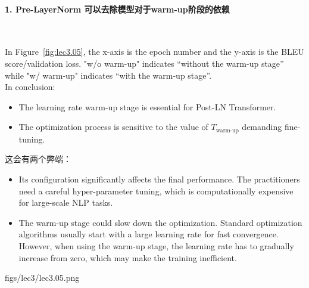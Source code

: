 \paragraph{1. Pre-LayerNorm 可以去除模型对于warm-up阶段的依赖}~{}

In Figure~\ref{fig:lec3.05}, the x-axis is the epoch number and the y-axis is the BLEU score/validation loss. "w/o warm-up" indicates “without the warm-up stage” while "w/ warm-up" indicates “with the warm-up stage”.\\
In conclusion:
\begin{itemize}
  \item The learning rate warm-up stage is essential for Post-LN Transformer.
  \item The optimization process is sensitive to the value of $T_{\text{warm-up}}$ demanding fine-tuning.
\end{itemize}

这会有两个弊端：
\begin{itemize}
  \item Its configuration significantly affects the final performance. The practitioners need a careful hyper-parameter tuning, which is computationally expensive for large-scale NLP tasks.
  \item The warm-up stage could slow down the optimization. Standard optimization algorithms usually start with a large learning rate for fast convergence. However, when using the warm-up stage, the learning rate has to gradually increase from zero, which may make the training inefficient.
\end{itemize}

  
\MarginImageWithNote
{figs/lec3/lec3.05.png}
{
  \label{fig:lec3.05}
}

